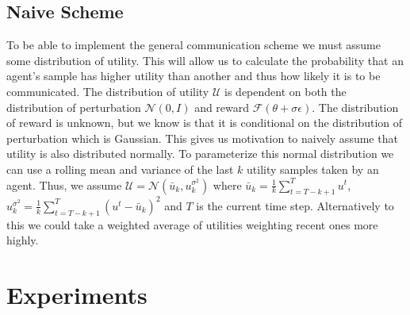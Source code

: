 
\subsection{Naive Scheme}
\label{sec:NaiveScheme}

To be able to implement the general communication scheme we must assume some distribution of utility. This will allow us to calculate the probability that an agent's sample has higher utility than another and thus how likely it is to be communicated. The distribution of utility $\mathcal{U}$ is dependent on both the distribution of perturbation $\mathcal{N}(0,I)$ and reward $\mathcal{F}(\theta +\sigma \epsilon)$. The distribution of reward is unknown, but we know is that it is conditional on the distribution of perturbation which is Gaussian. This gives us motivation to naively assume that utility is also distributed normally. To parameterize this normal distribution we can use a rolling mean and variance of the last $k$ utility samples taken by an agent. Thus, we assume $\mathcal{U} = \mathcal{N}(\bar{u}_k, u^{\sigma^2}_k)$ where $\bar{u}_k = \frac{1}{k} \sum_{t=T-k+1}^T u^t$, $u^{\sigma^2}_k = \frac{1}{k}\sum_{t=T-k+1}^T (u^t - \bar{u}_k)^2$ and $T$ is the current time step. Alternatively to this we could take a weighted average of utilities weighting recent ones more highly.


\section{Experiments}

